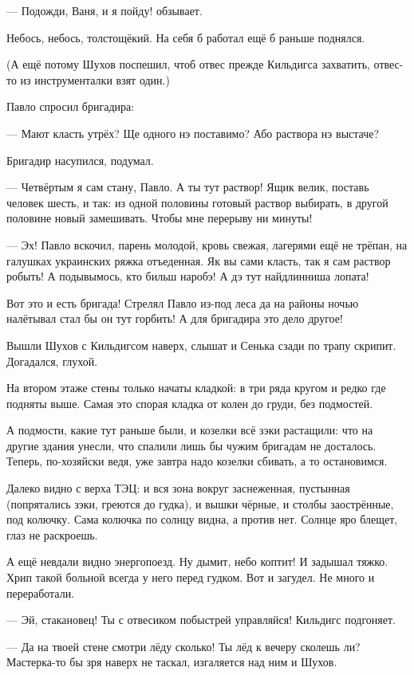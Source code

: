 --- Подожди, Ваня, и я пойду! \dash обзывает.

Небось, небось, толстощёкий. На себя б работал \dash ещё б раньше поднялся.

(А ещё потому Шухов поспешил, чтоб отвес прежде Кильдигса захватить, отвес-то из
инструменталки взят один.)

Павло спросил бригадира:

--- Мают класть утрёх? Ще одного нэ поставимо? Або раствора нэ выстаче?

Бригадир насупился, подумал.

--- Четвёртым я сам стану, Павло. А ты тут \dash раствор! Ящик велик, поставь человек шесть, и так:
из одной половины готовый раствор выбирать, в другой половине новый замешивать. Чтобы мне
перерыву ни минуты!

--- Эх! \dash Павло вскочил, парень молодой, кровь свежая, лагерями ещё не трёпан, на галушках
украинских ряжка отъеденная. \Dash Як вы сами класть, так я сам \dash раствор робыть! А подывымось,
кто бильш наробэ! А дэ тут найдлинниша лопата!

Вот это и есть бригада! Стрелял Павло из-под леса да на районы ночью налётывал \dash стал бы он
тут горбить! А для бригадира \dash это дело другое!

Вышли Шухов с Кильдигсом наверх, слышат \dash и Сенька сзади по трапу скрипит. Догадался, глухой.

На втором этаже стены только начаты кладкой: в три ряда кругом и редко где подняты выше.
Самая это спорая кладка \dash от колен до груди, без подмостей.

А подмости, какие тут раньше были, и козелки \dash всё зэки растащили: что на другие здания
унесли, что спалили \dash лишь бы чужим бригадам не досталось. Теперь, по-хозяйски ведя, уже
завтра надо козелки сбивать, а то остановимся.

Далеко видно с верха ТЭЦ: и вся зона вокруг заснеженная, пустынная (попрятались зэки, греются
до гудка), и вышки чёрные, и столбы заострённые, под колючку. Сама колючка по солнцу видна, а
против \dash нет. Солнце яро блещет, глаз не раскроешь.

А ещё невдали видно \dash энергопоезд. Ну дымит, небо коптит! И \dash задышал тяжко. Хрип такой
больной всегда у него перед гудком. Вот и загудел. Не много и переработали.

--- Эй, стакановец! Ты с отвесиком побыстрей управляйся! \dash Кильдигс подгоняет.

--- Да на твоей стене смотри лёду сколько! Ты лёд к вечеру сколешь ли? Мастерка-то бы зря наверх
не таскал, \dash изгаляется над ним и Шухов.

